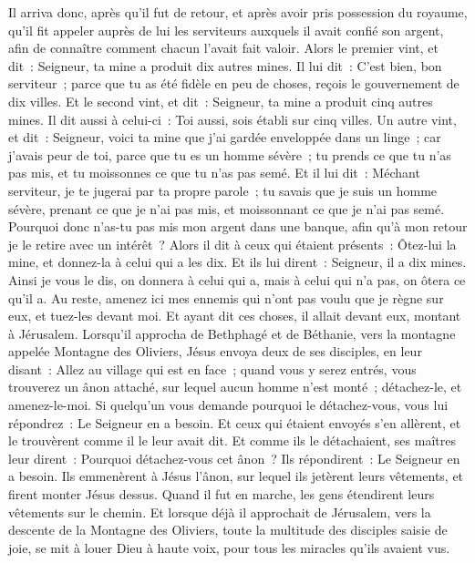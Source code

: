 \begin{multicols}{2}
Il arriva donc, après qu'il fut de retour, et après avoir pris possession du royaume, qu'il fit appeler auprès de lui les serviteurs auxquels il avait confié son argent, afin de connaître comment chacun l'avait fait valoir.
Alors le premier vint, et dit~: Seigneur, ta mine a produit dix autres mines.
Il lui dit~: C'est bien, bon serviteur~; parce que tu as été fidèle en peu de choses, reçois le gouvernement de dix villes.
Et le second vint, et dit~: Seigneur, ta mine a produit cinq autres mines.
Il dit aussi à celui-ci~: Toi aussi, sois établi sur cinq villes.
Un autre vint, et dit~: Seigneur, voici ta mine que j'ai gardée enveloppée dans un linge~;
car j'avais peur de toi, parce que tu es un homme sévère~; tu prends ce que tu n'as pas mis, et tu moissonnes ce que tu n'as pas semé.
Et il lui dit~: Méchant serviteur, je te jugerai par ta propre parole~; tu savais que je suis un homme sévère, prenant ce que je n'ai pas mis, et moissonnant ce que je n'ai pas semé.
Pourquoi donc n'as-tu pas mis mon argent dans une banque, afin qu'à mon retour je le retire avec un intérêt~?
Alors il dit à ceux qui étaient présents~: Ôtez-lui la mine, et donnez-la à celui qui a les dix.
Et ils lui dirent~: Seigneur, il a dix mines.
Ainsi je vous le dis, on donnera à celui qui a, mais à celui qui n'a pas, on ôtera ce qu'il a.
Au reste, amenez ici mes ennemis qui n'ont pas voulu que je règne sur eux, et tuez-les devant moi.
Et ayant dit ces choses, il allait devant eux, montant à Jérusalem.
Lorsqu'il approcha de Bethphagé et de Béthanie, vers la montagne appelée Montagne des Oliviers, Jésus envoya deux de ses disciples,
en leur disant~: Allez au village qui est en face~; quand vous y serez entrés, vous trouverez un ânon attaché, sur lequel aucun homme n'est monté~; détachez-le, et amenez-le-moi.
Si quelqu'un vous demande pourquoi le détachez-vous, vous lui répondrez~: Le Seigneur en a besoin.
Et ceux qui étaient envoyés s'en allèrent, et le trouvèrent comme il le leur avait dit.
Et comme ils le détachaient, ses maîtres leur dirent~: Pourquoi détachez-vous cet ânon~?
Ils répondirent~: Le Seigneur en a besoin.
Ils emmenèrent à Jésus l'ânon, sur lequel ils jetèrent leurs vêtements, et firent monter Jésus dessus.
Quand il fut en marche, les gens étendirent leurs vêtements sur le chemin.
Et lorsque déjà il approchait de Jérusalem, vers la descente de la Montagne des Oliviers, toute la multitude des disciples saisie de joie, se mit à louer Dieu à haute voix, pour tous les miracles qu'ils avaient vus.

\end{multicols}
